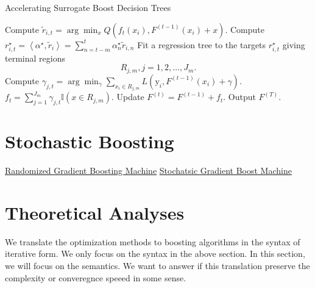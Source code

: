 \documentclass[UTF8]{article}
\begin{document}
\begin{algorithm}[h]
  \caption{Accelerating Surrogate Boost Decision Trees}
  \begin{algorithmic}[1]
  \STATE Compute $\tilde{r}_{i,t}=\arg\min_{x}Q(f_t(x_i), F^{(t-1)}(x_i)+x)$.
  \STATE Compute $r_{i,t}^{\star}=\left<\alpha^{\star}, \tilde r_i\right>=\sum_{n=t-m}^{t}\alpha_n^{\star}\tilde{r}_{i,n}$
  \ENDFOR
  \STATE  Fit a regression tree to the targets $r_{i,t}^{\star}$ giving terminal regions
     $$R_{j,m}, j = 1, 2,\dots , J_m. $$
  \STATE Compute $\gamma_{j,t}=\arg\min_{\gamma}\sum_{x_i\in R_{j,m}}{L(\mathrm{y}_i, F^{(t-1)}(x_i)+\gamma)}$.
  \ENDFOR
  \STATE $f_t={\sum}_{j=1}^{J_m}{\gamma}_{j, t} \mathbb{I}(x\in R_{j, m})$.
  \STATE Update $F^{(t)} = F^{(t-1)}+f_t$.
  \ENDFOR
  \STATE Output $F^{(T)}$.
  \end{algorithmic}
\end{algorithm}


\section{Stochastic Boosting}

\href{http://web.mit.edu/haihao/www/papers/RGBM.pdf}{Randomized Gradient Boosting Machine}
\href{http://docs.salford-systems.com/StochasticBoostingSS.pdf}{Stochatsic Gradient Boost Machine}

\section{Theoretical Analyses}

We translate the optimization methods to  boosting algorithms in the syntax of iterative form.
We only focus on the syntax in the above section.
In this section, we will focus on the semantics.
We want to answer if this translation preserve the complexity or converegnce speeed in some sense. 
\end{document}
